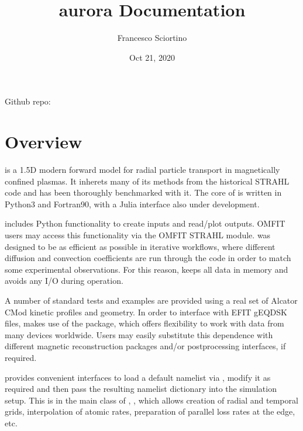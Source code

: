 \documentclass[letterpaper,10pt,english]{sphinxmanual}
\title{aurora Documentation}
\date{Oct 21, 2020}
\author{Francesco Sciortino}
\begin{document}
\pagestyle{empty}
\sphinxmaketitle
\pagestyle{plain}
\sphinxtableofcontents
\pagestyle{normal}
\label{\detokenize{index::doc}}


Github repo: 


\chapter{Overview}
\label{\detokenize{index:overview}}
{\hyperref[\detokenize{aurora:module-aurora}]{}} is a 1.5D modern forward model for radial particle transport in magnetically confined plasmas. It inherets many of its methods from the historical STRAHL code and has been thoroughly benchmarked with it. The core of {\hyperref[\detokenize{aurora:module-aurora}]{}} is written in Python3 and Fortran90, with a Julia interface also under development.

{\hyperref[\detokenize{aurora:module-aurora}]{}} includes Python functionality to create inputs and read/plot outputs. OMFIT users may access this functionality via the OMFIT STRAHL module. {\hyperref[\detokenize{aurora:module-aurora}]{}} was designed to be as efficient as possible in iterative workflows, where different diffusion and convection coefficients are run through the code in order to match some experimental observations. For this reason, {\hyperref[\detokenize{aurora:module-aurora}]{}} keeps all data in memory and avoids any I/O during operation.

A number of standard tests and examples are provided using a real set of Alcator C\sphinxhyphen{}Mod kinetic profiles and geometry. In order to interface with EFIT gEQDSK files, {\hyperref[\detokenize{aurora:module-aurora}]{}} makes use of the  package, which offers flexibility to work with data from many devices worldwide. Users may easily substitute this dependence with different magnetic reconstruction packages and/or postprocessing interfaces, if required.

{\hyperref[\detokenize{aurora:module-aurora}]{}} provides convenient interfaces to load a default namelist via {\hyperref[\detokenize{aurora:module-aurora.default_nml}]{}}, modify it as required and then pass the resulting namelist dictionary into the simulation setup. This is in the main class of {\hyperref[\detokenize{aurora:module-aurora}]{}}, {\hyperref[\detokenize{aurora:aurora.core.aurora_sim}]{}}, which allows creation of radial and temporal grids, interpolation of atomic rates, preparation of parallel loss rates at the edge, etc.
\end{document}
